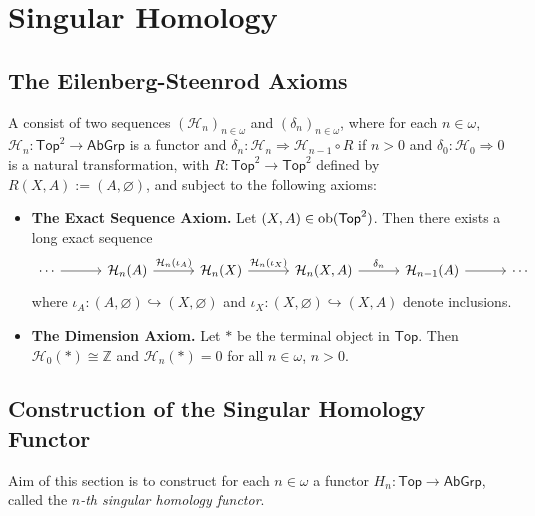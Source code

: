 \chapter{Singular Homology}
\section*{The Eilenberg-Steenrod Axioms}

\begin{definition}
	A  consist of two sequences $(\mathcal{H}_n)_{n \in \omega}$ and $(\delta_n)_{n \in \omega}$, where for each $n \in \omega$, $\mathcal{H}_n : \mathsf{Top}^2 \to \mathsf{AbGrp}$ is a functor and $\delta_n : \mathcal{H}_n \Rightarrow \mathcal{H}_{n - 1} \circ R$ if $n > 0$ and $\delta_0 : \mathcal{H}_0 \Rightarrow 0$ is a natural transformation, with $R : \mathsf{Top}^2 \to \mathsf{Top}^2$ defined by $R(X,A) := (A,\varnothing)$, and subject to the following axioms:
	\begin{itemize}[wide = 0pt]
		\item \textbf{The Exact Sequence Axiom.} Let $(X,A) \in \operatorname{ob}(\mathsf{Top}^2)$. Then there exists a long exact sequence
			\begin{equation*}
				\begin{tikzcd}[column sep=7ex]
					\cdots \arrow[r] & \mathcal{H}_n(A) \arrow[r,"\mathcal{H}_n(\iota_A)"] & \mathcal{H}_n(X) \arrow[r,"\mathcal{H}_n(\iota_X)"] & \mathcal{H}_n(X,A) \arrow[r,"\delta_n"] & \mathcal{H}_{n - 1}(A) \arrow[r] & \cdots
				\end{tikzcd}
			\end{equation*}
			\noindent where $\iota_A : (A,\varnothing) \hookrightarrow (X,\varnothing)$ and $\iota_X : (X,\varnothing) \hookrightarrow (X,A)$ denote inclusions.
		\item \textbf{The Dimension Axiom.} Let $\ast$ be the terminal object in $\mathsf{Top}$. Then $\mathcal{H}_0(\ast) \cong \mathbb{Z}$ and $\mathcal{H}_n(\ast) = 0$ for all $n \in \omega$, $n > 0$. 
	\end{itemize}
\end{definition}


\section*{Construction of the Singular Homology Functor}

Aim of this section is to construct for each $n \in \omega$ a functor $H_n : \mathsf{Top} \to \mathsf{AbGrp}$, called the \textit{$n$-th singular homology functor}.

